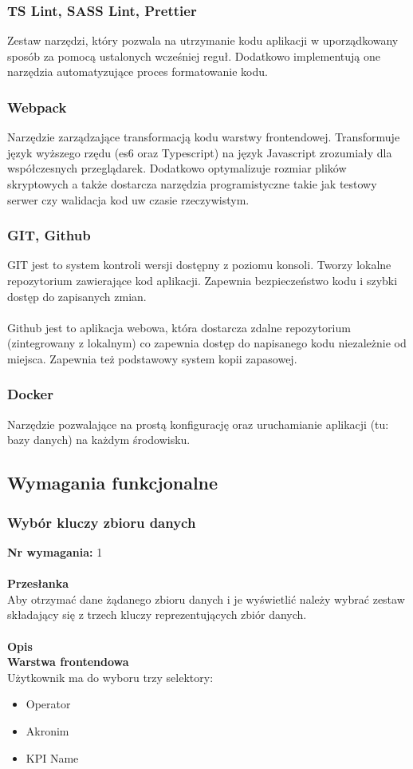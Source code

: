\documentclass[eng,printmode]{mgr}
\begin{document}
\subsubsection{TS Lint, SASS Lint, Prettier}
Zestaw narzędzi, który pozwala na utrzymanie kodu aplikacji w uporządkowany sposób za pomocą ustalonych wcześniej reguł. Dodatkowo implementują one narzędzia automatyzujące proces formatowanie kodu.
\subsubsection{Webpack}
Narzędzie zarządzające transformacją kodu warstwy frontendowej. Transformuje język wyższego rzędu (es6 oraz Typescript) na język Javascript zrozumiały dla współczesnych przeglądarek. Dodatkowo optymalizuje rozmiar plików skryptowych a także dostarcza narzędzia programistyczne takie jak testowy serwer czy walidacja kod uw czasie rzeczywistym.
\subsubsection{GIT, Github}
GIT jest to system kontroli wersji dostępny z poziomu konsoli. Tworzy lokalne repozytorium zawierające kod aplikacji. Zapewnia bezpieczeństwo kodu i szybki dostęp do zapisanych zmian.
\\\\
Github jest to aplikacja webowa, która dostarcza zdalne repozytorium (zintegrowany z lokalnym) co zapewnia dostęp do napisanego kodu niezależnie od miejsca. Zapewnia też podstawowy system kopii zapasowej.
\subsubsection{Docker}
Narzędzie pozwalające na prostą konfigurację oraz uruchamianie aplikacji (tu: bazy danych) na każdym środowisku.
\subsection{Wymagania funkcjonalne}
\subsubsection{Wybór kluczy zbioru danych}
\textbf{Nr wymagania:} 1 
\\\\
\textbf{Przesłanka}\\
Aby otrzymać dane żądanego zbioru danych i je wyświetlić należy wybrać zestaw składający się z trzech kluczy reprezentujących zbiór danych.
\\\\
\textbf{Opis}\\
\textbf{Warstwa frontendowa} \\
Użytkownik ma do wyboru trzy selektory:
\begin{itemize}
\item Operator
\item Akronim
\item KPI Name
\end{itemize}
\end{document}
